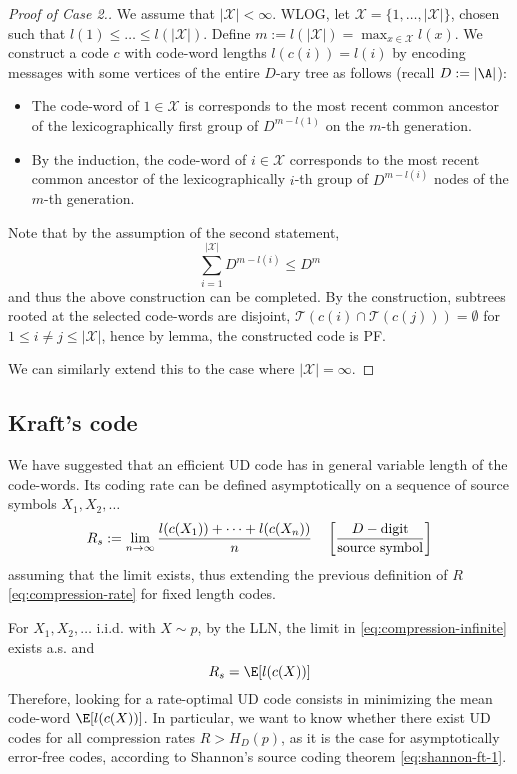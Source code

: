 \documentclass{../cs-classes/cs-classes}
\newcommand*{\X}{\mathcal{X}}
\begin{document}
\begin{proof}[Proof of Case 2.]
    We assume that $|\X|<\infty$. WLOG, let $\X=\{1, \dots, |\X|\}$, chosen such that $l(1)\leq\dots\leq l(|\X|)$. Define $m:=l(|\X|)=\max_{x\in\X} l(x)$. We construct a code $c$ with code-word lengths $l(c(i))=l(i)$ by encoding messages with some vertices of the entire $D$-ary tree as follows (recall $D:=|\A|$):
    \begin{itemize}
        \item The code-word of $1\in\X$ is corresponds to the most recent common ancestor of the lexicographically first group of $D^{m-l(1)}$ on the $m$-th generation.
        \item By the induction, the code-word of $i\in\X$ corresponds to the most recent common ancestor of the lexicographically $i$-th group of $D^{m-l(i)}$ nodes of the $m$-th generation.
    \end{itemize}

    Note that by the assumption of the second statement,
    \begin{equation*}
        \sum_{i=1}^{|\X|}D^{m-l(i)} \leq D^m
    \end{equation*}
    and thus the above construction can be completed. By the construction, subtrees rooted at the selected code-words are disjoint, $\mathcal{T}(c(i)\cap\mathcal{T}(c(j)))=\emptyset$ for $1\leq i\neq j\leq |\X|$, hence by lemma, the constructed code is PF.
    
    We can similarly extend this to the case where $|\X|=\infty$.
\end{proof}

\subsection{Kraft's code}
We have suggested that an efficient UD code has in general variable length of the code-words. Its coding rate can be defined asymptotically on a sequence of source symbols $X_1, X_2, \dots$
\begin{equation}
    \label{eq:compression-infinite}
    R_s := \lim_{n\to\infty} \frac{l(c(X_1))+\dots+l(c(X_n))}{n} \quad \left[\frac{D-\textnormal{digit}}{\textnormal{source symbol}}\right]
\end{equation}
assuming that the limit exists, thus extending the previous definition of $R$ \eqref{eq:compression-rate} for fixed length codes.

For $X_1, X_2, \dots$ i.i.d. with $X\sim p$, by the LLN, the limit in \eqref{eq:compression-infinite} exists a.s. and
\begin{equation*}
    R_s = \E[l(c(X))]
\end{equation*}
Therefore, looking for a rate-optimal UD code consists in minimizing the mean code-word $\E[l(c(X))]$. In particular, we want to know whether there exist UD codes for all compression rates $R>H_D(p)$, as it is the case for asymptotically error-free codes, according to Shannon's source coding theorem \eqref{eq:shannon-ft-1}.
\end{document}
